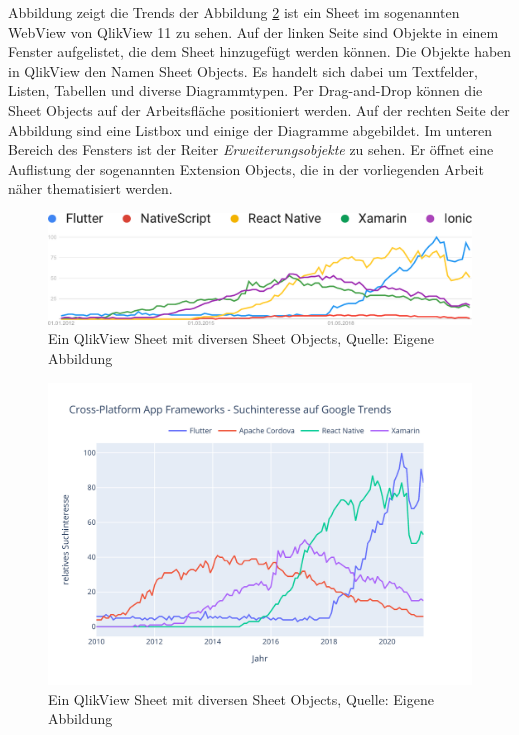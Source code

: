 \documentclass[11pt, twoside]{article}
\begin{document}






 


Abbildung zeigt die Trends der  Abbildung \ref{fig:Sheet} ist ein Sheet im sogenannten WebView von QlikView 11 zu sehen. Auf der linken Seite sind Objekte in einem Fenster aufgelistet, die dem Sheet hinzugefügt werden können. Die Objekte haben in QlikView den Namen Sheet Objects. Es handelt sich dabei um Textfelder, Listen, Tabellen und diverse Diagrammtypen. Per Drag-and-Drop können die Sheet Objects auf der Arbeitsfläche positioniert werden. Auf der rechten Seite der Abbildung sind eine Listbox und einige der Diagramme abgebildet. Im unteren Bereich des Fensters ist der Reiter \textit{Erweiterungsobjekte} zu sehen. Er öffnet eine Auflistung der sogenannten Extension Objects, die in der vorliegenden Arbeit näher thematisiert werden.

\begin{figure}[htbp]
	\centering
    \includegraphics[width=1.0\textwidth]{images/charts/Google Trends/frameworks.pdf}
	\caption[ Weltweit Ein QlikView Sheet mit diversen Sheet Objects]{Ein QlikView Sheet mit diversen Sheet Objects, Quelle: Eigene Abbildung}
	\label{fig:Sheet}
\end{figure}


\begin{figure}[htbp]
	\centering
    \includegraphics[width=1.0\textwidth]{images/charts/Google Trends/frameworks_plot.pdf}
	\caption[ Weltweit Ein QlikView Sheet mit diversen Sheet Objects]{Ein QlikView Sheet mit diversen Sheet Objects, Quelle: Eigene Abbildung}
	\label{fig:Sheet}
\end{figure}

 





% 

\end{document}
